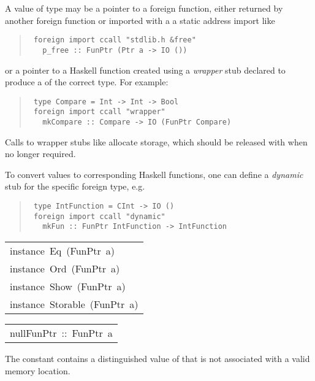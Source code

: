 \begin{haddockdesc}
\begin{itemize}
\end{itemize}
A value of type  may be a pointer to a foreign function,
 either returned by another foreign function or imported with a
 a static address import like
\par
\begin{quote}
{\haddockverb\begin{verbatim}
 foreign import ccall "stdlib.h &free"
   p_free :: FunPtr (Ptr a -> IO ())
\end{verbatim}}
\end{quote}
or a pointer to a Haskell function created using a \emph{wrapper} stub
 declared to produce a  of the correct type.  For example:
\par
\begin{quote}
{\haddockverb\begin{verbatim}
 type Compare = Int -> Int -> Bool
 foreign import ccall "wrapper"
   mkCompare :: Compare -> IO (FunPtr Compare)
\end{verbatim}}
\end{quote}
Calls to wrapper stubs like  allocate storage, which
 should be released with  when no
 longer required.
\par
To convert  values to corresponding Haskell functions, one
 can define a \emph{dynamic} stub for the specific foreign type, e.g.
\par
\begin{quote}
{\haddockverb\begin{verbatim}
 type IntFunction = CInt -> IO ()
 foreign import ccall "dynamic" 
   mkFun :: FunPtr IntFunction -> IntFunction
\end{verbatim}}
\end{quote}

\end{haddockdesc}
\begin{haddockdesc}
\item[\begin{tabular}{@{}l}
instance\ Eq\ (FunPtr\ a)\\instance\ Ord\ (FunPtr\ a)\\instance\ Show\ (FunPtr\ a)\\instance\ Storable\ (FunPtr\ a)
\end{tabular}]
\end{haddockdesc}
\begin{haddockdesc}
\item[\begin{tabular}{@{}l}
nullFunPtr\ ::\ FunPtr\ a
\end{tabular}]\haddockbegindoc
The constant  contains a
 distinguished value of  that is not
 associated with a valid memory location.
\par

\end{haddockdesc}
